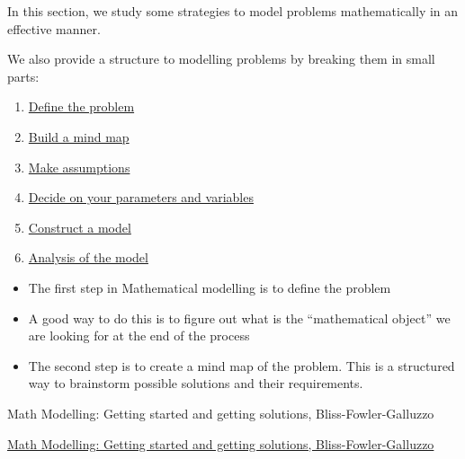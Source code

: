 
%
%


\begin{topic}


In this section, we study some strategies to model problems mathematically in an effective manner.

We also provide a structure to modelling problems by breaking them in small parts:

\begin{enumerate}[label={\bf \Alph*.}]
	\item \hyperref[A-define]{Define the problem}
	\item \hyperref[B-mindmap]{Build a mind map}
	\item \hyperref[C-assumptions]{Make assumptions}
	\item \hyperref[D-parvsvar]{Decide on your parameters and variables}
	\item \hyperref[E-model]{Construct a model}
	\item \hyperref[F-analysis]{Analysis of the model}
\end{enumerate}



\end{topic}


\begin{module}

	\begin{itemize}
		\item The first step in Mathematical modelling is to define the problem
		\item A good way to do this is to figure out what is the ``mathematical object'' we are looking for at the end of the process

		\item The second step is to create a mind map of the problem. This is a structured way to brainstorm possible solutions and their requirements.
	\end{itemize}
	

\begin{annotation}
	\begin{goals}
	Math Modelling: Getting started and getting solutions, Bliss-Fowler-Galluzzo
	
	\hfill {}	
	\end{goals}
\end{annotation}
	 \href{https://m3challenge.siam.org/resources/modeling-handbook}{Math Modelling: Getting started and getting solutions, Bliss-Fowler-Galluzzo}

\end{module}





